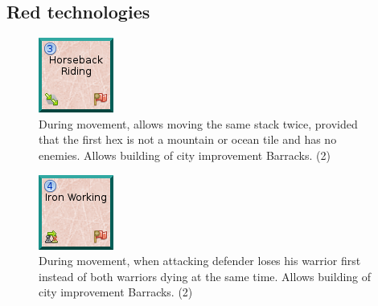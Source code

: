 \documentclass[11pt,a4paper,titlepage]{article}
\begin{document}
{{  }\label{subsec:yellow_technologies}
  \newpage
  \subsection{Red technologies}{

    \begin{figure}[!htb]
    \begin{minipage}[c]{0.1\textwidth}
      \includegraphics[scale=.7]{doe_tech_horseback_riding.png}
    \end{minipage}\hfill
    \begin{minipage}[c]{0.6\textwidth}
      \captionsetup{labelformat=empty, justification=justified, singlelinecheck=false}
      \caption{During movement, allows moving the same stack twice, provided that the first hex is not a mountain or ocean tile and has no enemies. Allows building of city improvement Barracks. (2)}
    \end{minipage}\hfill
    \label{fig:tech_horseback_riding}
  \end{figure}

  \begin{figure}[!htb]
    \begin{minipage}[c]{0.1\textwidth}
      \includegraphics[scale=.7]{doe_tech_iron_working.png}
    \end{minipage}\hfill
    \begin{minipage}[c]{0.6\textwidth}
      \captionsetup{labelformat=empty, justification=justified, singlelinecheck=false}
      \caption{During movement, when attacking defender loses his warrior first instead of both warriors dying at the same time. Allows building of city improvement Barracks. (2)}
    \end{minipage}\hfill
    \label{fig:tech_iron_working}
  \end{figure}

}}
\end{document}

